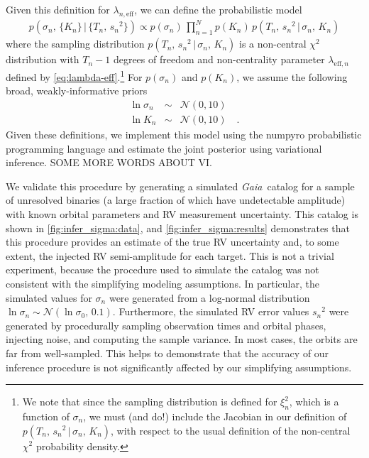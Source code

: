 \documentclass[modern, letterpaper]{aastex631}
\newcommand{\package}[1]{\textsf{#1}}
\newcommand{\project}[1]{\textsl{#1}}
\newcommand{\Gaia}{\project{Gaia}}
\begin{document}
Given this definition for $\lambda_{n,\mathrm{eff}}$, we can define the probabilistic model
\begin{eqnarray}
	p(\sigma_n,\,\{K_n\}\,|\,\{T_n,\,{s_n}^2\}) \propto
	p(\sigma_n)\,\prod_{n=1}^{N} p(K_n)\,p(T_n,\,{s_n}^2\,|\,\sigma_n,\,K_n)
\end{eqnarray}
where the sampling distribution $p(T_n,\,{s_n}^2\,|\,\sigma_n,\,K_n)$ is a non-central $\chi^2$ distribution with $T_n - 1$ degrees of freedom and non-centrality parameter $\lambda_{\mathrm{eff},n}$ defined by \autoref{eq:lambda-eff}.\footnote{We note that since the sampling distribution is defined for $\xi_n^2$, which is a function of $\sigma_n$, we must (and do!) include the Jacobian in our definition of $p(T_n,\,{s_n}^2\,|\,\sigma_n,\,K_n)$, with respect to the usual definition of the non-central $\chi^2$ probability density.}
For $p(\sigma_n)$ and $p(K_n)$, we assume the following broad, weakly-informative priors
\begin{eqnarray}
	\ln \sigma_n &\sim& \mathcal{N}(0, 10) \nonumber\\
	\ln K_n &\sim& \mathcal{N}(0, 10) \quad.
\end{eqnarray}
Given these definitions, we implement this model using the \package{numpyro} probabilistic programming language and estimate the joint posterior using variational inference.
SOME MORE WORDS ABOUT VI.

We validate this procedure by generating a simulated \Gaia\ catalog for a sample of unresolved binaries (a large fraction of which have undetectable amplitude) with known orbital parameters and RV measurement uncertainty.
This catalog is shown in \autoref{fig:infer_sigma:data}, and \autoref{fig:infer_sigma:results} demonstrates that this procedure provides an estimate of the true RV uncertainty and, to some extent, the injected RV semi-amplitude for each target.
This is not a trivial experiment, because the procedure used to simulate the catalog was not consistent with the simplifying modeling assumptions.
In particular, the simulated values for $\sigma_n$ were generated from a log-normal distribution $\ln\sigma_n \sim \mathcal{N}(\ln\sigma_0,\,0.1)$.
Furthermore, the simulated RV error values ${s_n}^2$ were generated by procedurally sampling observation times and orbital phases, injecting noise, and computing the sample variance.
In most cases, the orbits are far from well-sampled.
This helps to demonstrate that the accuracy of our inference procedure is not significantly affected by our simplifying assumptions.
\end{document}
